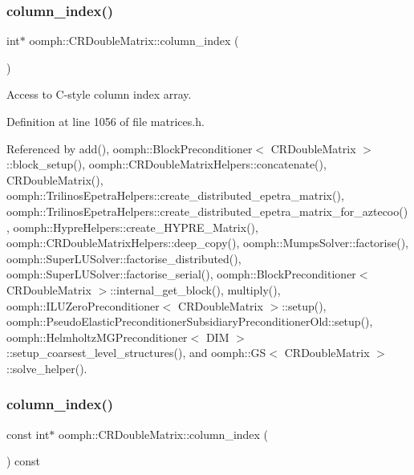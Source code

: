 \subsubsection{\texorpdfstring{column\+\_\+index()}{column\_index()}\hspace{0.1cm}{\footnotesize\ttfamily [1/2]}}
{\footnotesize\ttfamily int$\ast$ oomph\+::\+C\+R\+Double\+Matrix\+::column\+\_\+index (\begin{DoxyParamCaption}{ }\end{DoxyParamCaption})\hspace{0.3cm}{\ttfamily [inline]}}



Access to C-\/style column index array. 



Definition at line 1056 of file matrices.\+h.



Referenced by add(), oomph\+::\+Block\+Preconditioner$<$ C\+R\+Double\+Matrix $>$\+::block\+\_\+setup(), oomph\+::\+C\+R\+Double\+Matrix\+Helpers\+::concatenate(), C\+R\+Double\+Matrix(), oomph\+::\+Trilinos\+Epetra\+Helpers\+::create\+\_\+distributed\+\_\+epetra\+\_\+matrix(), oomph\+::\+Trilinos\+Epetra\+Helpers\+::create\+\_\+distributed\+\_\+epetra\+\_\+matrix\+\_\+for\+\_\+aztecoo(), oomph\+::\+Hypre\+Helpers\+::create\+\_\+\+H\+Y\+P\+R\+E\+\_\+\+Matrix(), oomph\+::\+C\+R\+Double\+Matrix\+Helpers\+::deep\+\_\+copy(), oomph\+::\+Mumps\+Solver\+::factorise(), oomph\+::\+Super\+L\+U\+Solver\+::factorise\+\_\+distributed(), oomph\+::\+Super\+L\+U\+Solver\+::factorise\+\_\+serial(), oomph\+::\+Block\+Preconditioner$<$ C\+R\+Double\+Matrix $>$\+::internal\+\_\+get\+\_\+block(), multiply(), oomph\+::\+I\+L\+U\+Zero\+Preconditioner$<$ C\+R\+Double\+Matrix $>$\+::setup(), oomph\+::\+Pseudo\+Elastic\+Preconditioner\+Subsidiary\+Preconditioner\+Old\+::setup(), oomph\+::\+Helmholtz\+M\+G\+Preconditioner$<$ D\+I\+M $>$\+::setup\+\_\+coarsest\+\_\+level\+\_\+structures(), and oomph\+::\+G\+S$<$ C\+R\+Double\+Matrix $>$\+::solve\+\_\+helper().

\mbox{\label{classoomph_1_1CRDoubleMatrix_a886a481d11974f5707405f573fcb9850}} 
\subsubsection{\texorpdfstring{column\+\_\+index()}{column\_index()}\hspace{0.1cm}{\footnotesize\ttfamily [2/2]}}
{\footnotesize\ttfamily const int$\ast$ oomph\+::\+C\+R\+Double\+Matrix\+::column\+\_\+index (\begin{DoxyParamCaption}{ }\end{DoxyParamCaption}) const\hspace{0.3cm}{\ttfamily [inline]}}



